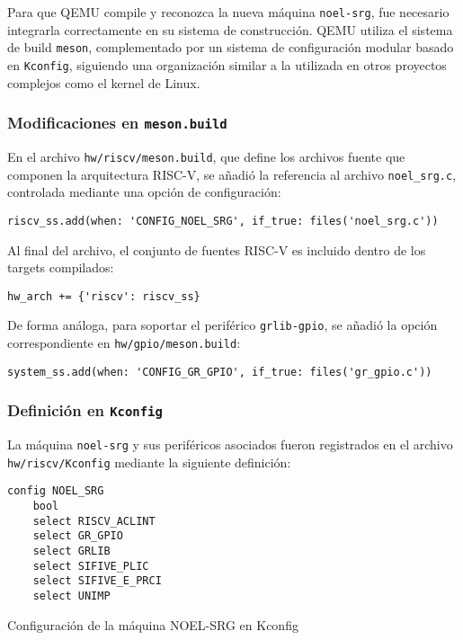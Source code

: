 Para que QEMU compile y reconozca la nueva máquina \texttt{noel-srg}, fue necesario integrarla correctamente en su sistema de construcción. QEMU utiliza el sistema de build \texttt{meson}, complementado por un sistema de configuración modular basado en \texttt{Kconfig}, siguiendo una organización similar a la utilizada en otros proyectos complejos como el kernel de Linux.

\subsubsection*{Modificaciones en \texttt{meson.build}}

En el archivo \texttt{hw/riscv/meson.build}, que define los archivos fuente que componen la arquitectura RISC-V, se añadió la referencia al archivo \texttt{noel\_srg.c}, controlada mediante una opción de configuración:

\begin{verbatim}
riscv_ss.add(when: 'CONFIG_NOEL_SRG', if_true: files('noel_srg.c'))
\end{verbatim}

Al final del archivo, el conjunto de fuentes RISC-V es incluido dentro de los targets compilados:

\begin{verbatim}
hw_arch += {'riscv': riscv_ss}
\end{verbatim}

De forma análoga, para soportar el periférico \texttt{grlib-gpio}, se añadió la opción correspondiente en \texttt{hw/gpio/meson.build}:

\begin{verbatim}
system_ss.add(when: 'CONFIG_GR_GPIO', if_true: files('gr_gpio.c'))
\end{verbatim}

\subsubsection*{Definición en \texttt{Kconfig}}

La máquina \texttt{noel-srg} y sus periféricos asociados fueron registrados en el archivo \texttt{hw/riscv/Kconfig} mediante la siguiente definición:

\begin{codefloat}
\begin{lstlisting}[style=CppExample]
config NOEL_SRG
    bool
    select RISCV_ACLINT
    select GR_GPIO
    select GRLIB
    select SIFIVE_PLIC
    select SIFIVE_E_PRCI
    select UNIMP
\end{lstlisting}
\caption{Configuración de la máquina NOEL-SRG en Kconfig}
\end{codefloat}

